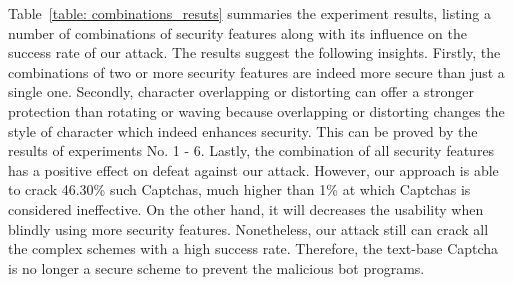 Table~\ref{table: combinations_resuts} summaries the experiment results, listing a number of combinations of security features along with its influence on the success rate of our attack.
The results suggest the following insights.  Firstly, the combinations of two or more security features are indeed more secure than just a single one. Secondly, character overlapping or distorting can offer a stronger protection than rotating or waving because overlapping or distorting changes the style of character which indeed enhances security. This can be proved by the results of experiments No. 1 - 6. Lastly, the combination of all security features has a positive effect on defeat against our attack. However, our approach is able to crack 46.30\% such Captchas, much higher than 1\% at which Captchas is considered ineffective. On the other hand, it will decreases the usability when blindly using more security features. Nonetheless, our attack still can crack all the complex schemes with a high success rate. Therefore, the text-base Captcha is no longer a secure scheme to prevent the malicious bot programs. 
